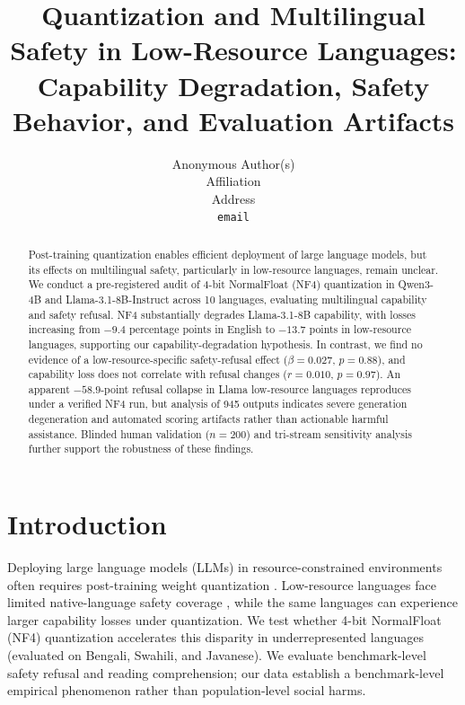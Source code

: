 \documentclass{article}
\title{Quantization and Multilingual Safety in Low-Resource Languages:\\
Capability Degradation, Safety Behavior, and Evaluation Artifacts}
\author{
  Anonymous Author(s) \\
  Affiliation \\
  Address \\
  \texttt{email}
}
\newcommand{\qwen}{Qwen3-4B}
\newcommand{\llama}{Llama-3.1-8B}
\begin{document}
\maketitle
\enlargethispage{4\baselineskip}

\vspace{-6pt}
\begin{abstract}
\vspace{-5pt}
Post-training quantization enables efficient deployment of large language models, but its effects on multilingual safety, particularly in low-resource languages, remain unclear. We conduct a pre-registered audit of 4-bit NormalFloat (NF4) quantization in \qwen{} and \llama{}-Instruct across 10 languages, evaluating multilingual capability and safety refusal. NF4 substantially degrades \llama{} capability, with losses increasing from $-9.4$ percentage points in English to $-13.7$ points in low-resource languages, supporting our capability-degradation hypothesis. In contrast, we find no evidence of a low-resource-specific safety-refusal effect ($\beta = 0.027$, $p = 0.88$), and capability loss does not correlate with refusal changes ($r = 0.010$, $p = 0.97$). An apparent $-58.9$-point refusal collapse in Llama low-resource languages reproduces under a verified NF4 run, but analysis of 945 outputs indicates severe generation degeneration and automated scoring artifacts rather than actionable harmful assistance. Blinded human validation ($n = 200$) and tri-stream sensitivity analysis further support the robustness of these findings.
\end{abstract}
\vspace{-6pt}

\section{Introduction}
\label{sec:intro}

Deploying large language models (LLMs) in resource-constrained environments often requires post-training weight quantization \citep{dettmers2023qlora}. Low-resource languages face limited native-language safety coverage \citep{yong2023lowresource,li2024preference}, while the same languages can experience larger capability losses under quantization. We test whether 4-bit NormalFloat (NF4) quantization accelerates this disparity in underrepresented languages (evaluated on Bengali, Swahili, and Javanese). We evaluate benchmark-level safety refusal and reading comprehension; our data establish a benchmark-level empirical phenomenon rather than population-level social harms.
\end{document}
